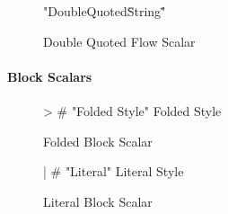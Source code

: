 \begin{figure}[H]
  \begin{minipage}[t]{0.48\textwidth}
    \vspace{0pt}
    \begin{bchart}[max=9, width=0.85\textwidth]
    \end{bchart}
  \end{minipage}
  \begin{minipage}[t]{0.48\textwidth}
    \vspace{0pt}
    \begin{yamlcode}
      "Double\n Quoted\n \"String\""
    \end{yamlcode}
  \end{minipage}
  \caption{Double Quoted Flow Scalar}
\end{figure}

\paragraph{Block Scalars}

\begin{figure}[H]
  \begin{minipage}[t]{0.48\textwidth}
    \vspace{0pt}
    \begin{bchart}[max=9, width=0.85\textwidth]
    \end{bchart}
  \end{minipage}
  \begin{minipage}[t]{0.48\textwidth}
    \vspace{0pt}
    \begin{yamlcode}
      > # "Folded Style"
        Folded
        Style
    \end{yamlcode}
  \end{minipage}
  \caption{Folded Block Scalar}
\end{figure}

\begin{figure}[H]
  \begin{minipage}[t]{0.48\textwidth}
    \vspace{0pt}
    \begin{bchart}[max=9, width=0.85\textwidth]
    \end{bchart}
  \end{minipage}
  \begin{minipage}[t]{0.48\textwidth}
    \vspace{0pt}
    \begin{yamlcode}
      | # "Literal\nStyle"
        Literal
        Style
    \end{yamlcode}
  \end{minipage}
  \caption{Literal Block Scalar}
\end{figure}

